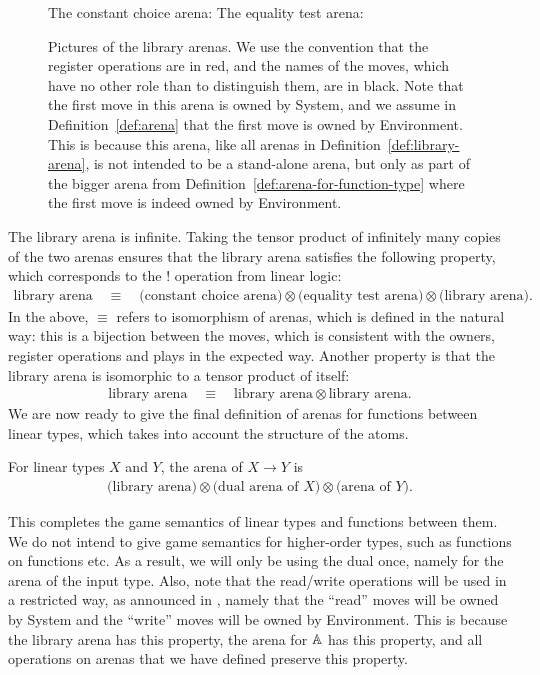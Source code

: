 \documentclass[a4paper,UKenglish,cleveref, autoref, numberwithinsect, thm-restate]{lipics-v2021}
\begin{document}
\begin{figure}
The constant choice arena:
The equality test arena:
\caption{\label{fig:library-arenas} Pictures of the library arenas.  We use the convention that the register operations are in red, and the names of the moves, which have no other role than to distinguish them, are in black. 
Note that the first move in this arena is owned by System, and we assume in Definition~\ref{def:arena} that the first move is owned by Environment. This is because this arena, like all arenas in Definition~\ref{def:library-arena}, is not intended to be a stand-alone arena, but only as part of the bigger arena from Definition~\ref{def:arena-for-function-type} where the first move is indeed owned by Environment. } 
\end{figure}
       
The library arena is infinite. Taking the tensor product of infinitely many copies of the two arenas ensures that the library arena satisfies the following property, which corresponds to the $!$ operation from linear logic: 
\begin{align}\label{eq:bang-library-arena}
\text{library arena} 
\quad \equiv \quad 
\text{(constant choice arena)} \otimes 
\text{(equality test arena)} \otimes
 \text{(library arena)}.
\end{align}
In the above, $\equiv$ refers to isomorphism of arenas, which is defined in the natural way: this is a bijection between the moves, which is consistent with the owners, register operations and plays in the expected way.  Another property is that the library arena is isomorphic to a tensor product of itself: 
\begin{align}\label{eq:library-arena-isomorphism}
\text{library arena}
\quad \equiv \quad
\text{library arena} \otimes \text{library arena}.
\end{align}
We are now ready to give the final definition of arenas for functions between linear types, which takes into account the structure of the atoms.

\begin{definition}\label{def:arena-for-function-type} For linear types $X$ and $Y$, the arena of $X \to Y$ is 
    \begin{align*}
    \text{(library arena)} \otimes \text{(dual arena of $X$)} \otimes \text{(arena of $Y$)}.
    \end{align*}
\end{definition}
This completes the game semantics of linear types and functions between them. We do not intend to give game semantics for higher-order types, such as functions on functions etc. As a result, we will only be using the dual once, namely for the arena of the input type. Also, note that the read/write operations will be used in a restricted way, as announced in , namely that the ``read'' moves will be owned by System and the ``write'' moves will be owned by Environment.  This is because the library arena has this property, the arena for $\mathbb A$ has this property, and all operations on arenas that we have defined preserve this property.
\end{document}
